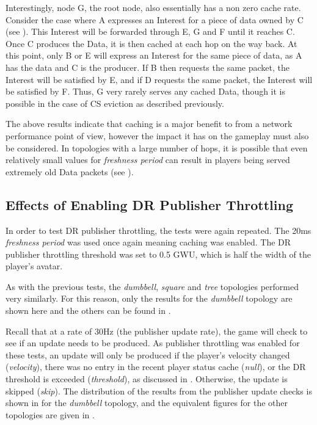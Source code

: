 Interestingly, node G, the root node, also essentially has a non zero cache rate. Consider the case where A expresses an Interest for a piece of data owned by C (see ). This Interest will be forwarded through E, G and F until it reaches C. Once C produces the Data, it is then cached at each hop on the way back. At this point, only B or E will express an Interest for the same piece of data, as A has the data and C is the producer. If B then requests the same packet, the Interest will be satisfied by E, and if D requests the same packet, the Interest will be satisfied by F. Thus, G very rarely serves any cached Data, though it is possible in the case of CS eviction as described previously. 

The above results indicate that caching is a major benefit to \game{} from a network performance point of view, however the impact it has on the gameplay must also be considered. In topologies with a large number of hops, it is possible that even relatively small values for \textit{freshness period} can result in players being served extremely old Data packets (see ).


\subsection{Effects of Enabling DR Publisher Throttling}
In order to test DR publisher throttling, the tests were again repeated. The 20ms \textit{freshness period} was used once again meaning caching was enabled. The DR publisher throttling threshold was set to 0.5 GWU, which is half the width of the player's avatar. 

As with the previous tests, the \textit{dumbbell}, \textit{square} and \textit{tree} topologies performed very similarly. For this reason, only the results for the \textit{dumbbell} topology are shown here and the others can be found in .

Recall that at a rate of 30Hz (the publisher update rate), the game will check to see if an update needs to be produced. As publisher throttling was enabled for these tests, an update will only be produced if the player's velocity changed (\textit{velocity}), there was no entry in the recent player status cache (\textit{null}), or the DR threshold is exceeded (\textit{threshold}), as discussed in . Otherwise, the update is skipped (\textit{skip}). The distribution of the results from the publisher update checks is shown in  for the \textit{dumbbell} topology, and the equivalent figures for the other topologies are given in .

